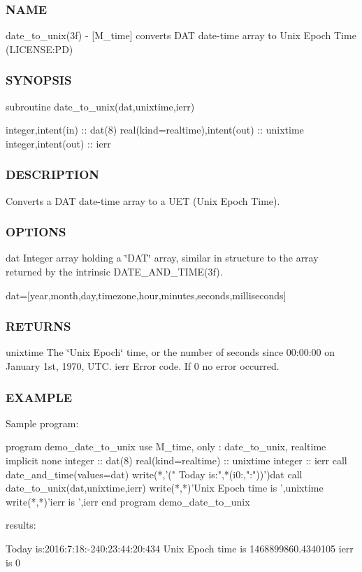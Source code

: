 \subsubsection*{N\+A\+ME}

date\+\_\+to\+\_\+unix(3f) -\/ \mbox{[}M\+\_\+time\mbox{]} converts D\+AT date-\/time array to Unix Epoch Time (L\+I\+C\+E\+N\+SE\+:PD) 

\subsubsection*{S\+Y\+N\+O\+P\+S\+IS}

\begin{DoxyVerb}subroutine date_to_unix(dat,unixtime,ierr)

 integer,intent(in)               :: dat(8)
 real(kind=realtime),intent(out)  :: unixtime
 integer,intent(out)              :: ierr
\end{DoxyVerb}


\subsubsection*{D\+E\+S\+C\+R\+I\+P\+T\+I\+ON}

Converts a D\+AT date-\/time array to a U\+ET (Unix Epoch Time).

\subsubsection*{O\+P\+T\+I\+O\+NS}

dat Integer array holding a \char`\"{}\+D\+A\+T\char`\"{} array, similar in structure to the array returned by the intrinsic D\+A\+T\+E\+\_\+\+A\+N\+D\+\_\+\+T\+I\+M\+E(3f).

dat=\mbox{[}year,month,day,timezone,hour,minutes,seconds,milliseconds\mbox{]} \subsubsection*{R\+E\+T\+U\+R\+NS}

unixtime The \char`\"{}\+Unix Epoch\char`\"{} time, or the number of seconds since 00\+:00\+:00 on January 1st, 1970, U\+TC. ierr Error code. If 0 no error occurred.

\subsubsection*{E\+X\+A\+M\+P\+LE}

\begin{DoxyVerb}Sample program:

 program demo_date_to_unix
 use M_time, only : date_to_unix, realtime
 implicit none
 integer             :: dat(8)
 real(kind=realtime) :: unixtime
 integer             :: ierr
    call date_and_time(values=dat)
    write(*,'(" Today is:",*(i0:,":"))')dat
    call date_to_unix(dat,unixtime,ierr)
    write(*,*)'Unix Epoch time is ',unixtime
    write(*,*)'ierr is ',ierr
 end program demo_date_to_unix

results:

 Today is:2016:7:18:-240:23:44:20:434
 Unix Epoch time is    1468899860.4340105
 ierr is            0
\end{DoxyVerb}
